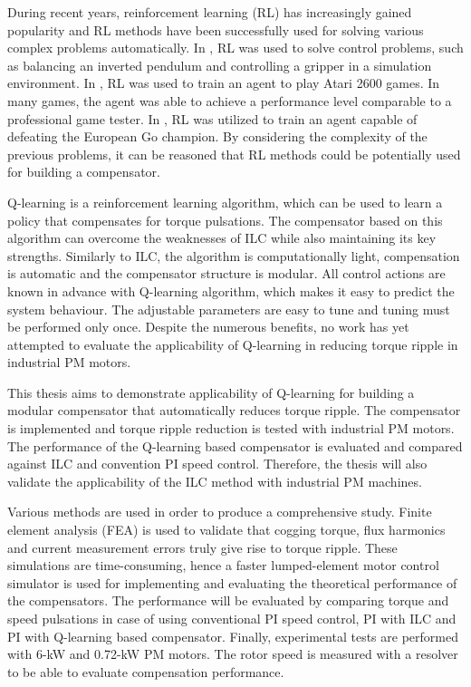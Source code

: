 During recent years, reinforcement learning (RL) has increasingly gained popularity and RL methods have been successfully used for solving various complex problems automatically. In \cite{RL:control, RL:control2}, RL was used to solve control problems, such as balancing an inverted pendulum and controlling a gripper in a simulation environment. In \cite{RL:atari}, RL was used to train an agent to play Atari 2600 games. In many games, the agent was able to achieve a performance level comparable to a professional game tester. In \cite{RL:alphago}, RL was utilized to train an agent capable of defeating the European Go champion. By considering the complexity of the previous problems, it can be reasoned that RL methods could be potentially used for building a compensator.

Q-learning is a reinforcement learning algorithm, which can be used to learn a policy that compensates for torque pulsations. The compensator based on this algorithm can overcome the weaknesses of ILC while also maintaining its key strengths. Similarly to ILC, the algorithm is computationally light, compensation is automatic and the compensator structure is modular. All control actions are known in advance with Q-learning algorithm, which makes it easy to predict the system behaviour. The adjustable parameters are easy to tune and tuning must be performed only once. Despite the numerous benefits, no work has yet attempted to evaluate the applicability of Q-learning in reducing torque ripple in industrial PM motors.

This thesis aims to demonstrate applicability of Q-learning for building a modular compensator that automatically reduces torque ripple. The compensator is implemented and torque ripple reduction is tested with industrial PM motors. The performance of the Q-learning based compensator is evaluated and compared against ILC and convention PI speed control. Therefore, the thesis will also validate the applicability of the ILC method with industrial PM machines.

Various methods are used in order to produce a comprehensive study. Finite element analysis (FEA) is used to validate that cogging torque, flux harmonics and current measurement errors truly give rise to torque ripple. These simulations are time-consuming, hence a faster lumped-element motor control simulator is used for implementing and evaluating the theoretical performance of the compensators. The performance will be evaluated by comparing torque and speed pulsations in case of using conventional PI speed control, PI with ILC and PI with Q-learning based compensator. Finally, experimental tests are performed with 6-kW and 0.72-kW PM motors. The rotor speed is measured with a resolver to be able to evaluate compensation performance.


